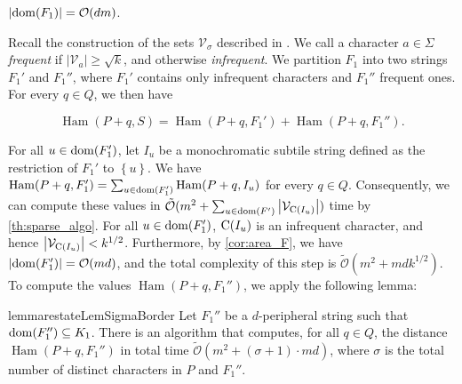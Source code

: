 \documentclass[twoside,leqno]{article}
\renewcommand{\O}{\mathcal{O}}
\newcommand{\tO}{\tilde{\mathcal{O}}}
\newcommand{\V}{\mathcal{V}}
\newcommand{\set}[1]{\left\lbrace #1 \right\rbrace}
\DeclareMathOperator*{\Ham}{Ham}
\newcommand{\absolute}[1]{\left\lvert#1\right\rvert}
\begin{document}
\begin{corollary}\label{cor:area_F}
$\absolute{\d{F_1}} = \O(dm)$. 
\end{corollary}

Recall the construction of the sets $\V_\sigma$ described in . We call a character $a \in \Sigma$ \emph{frequent} if $\absolute{\V_a} \ge \sqrt{k}$, and otherwise \emph{infrequent}. We partition $F_1$ into two strings $F_1'$ and $F_1''$, where $F_1'$ contains only infrequent characters and $F_1''$ frequent ones. For every $q \in Q$, we then have 

\[\Ham(P + q, S) = \Ham(P + q, F_1') + \Ham(P + q, F_1'').\]

For all $u \in \operatorname*{dom}(F_1')$, let $I_u$ be a monochromatic subtile string defined as the restriction of $F_1'$ to $\set{u}$. 
We have $\Ham(P + q, F_1') = \sum_{u \in \d{F_1'}} \Ham(P + q, I_u)$ for every $q \in Q$. 
Consequently, we can compute these values in $\tO(m^2 + \sum_{u \in \d{F'}} \absolute{\V_{\getchar{I_u}}})$ time by \cref{th:sparse_algo}. 
For all $u \in \operatorname*{dom}(F_1')$, $\operatorname*{C}(I_u)$ is an infrequent character, and hence $\absolute{\V_{\getchar{I_u}}} < k^{1/2}$. 
Furthermore, by \cref{cor:area_F}, we have $\absolute{\d{F_1'}} = \O(md)$, and the total complexity of this step is $\tO(m^2 + mdk^{1/2})$. 
To compute the values $\Ham(P + q, F_1'')$, we apply the following lemma:

\begin{restatable}{lemma}{restateLemSigmaBorder}\label{lm:sigma_border}
Let $F_1''$ be a $d$-peripheral string such that $\operatorname*{dom}(F_1'') \subseteq K_1$. There is an algorithm that computes, for all $q \in Q$, the distance $\Ham(P + q, F_1'')$ in total time $\tO(m^2 + (\sigma+1) \cdot md)$, where $\sigma$ is the total number of distinct characters in $P$ and $F_1''$.
\end{restatable}
\end{document}
